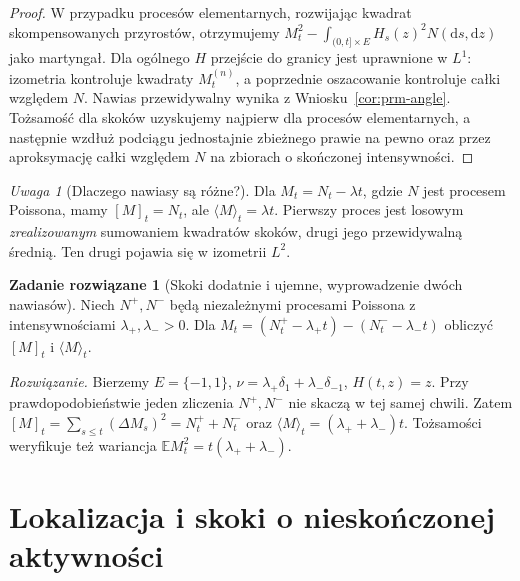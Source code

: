 \documentclass[11pt,a4paper,oneside]{report}
\numberwithin{equation}{chapter}
\theoremstyle{plain}
\theoremstyle{definition}
\newtheorem{zadanie}{Zadanie rozwiązane}[chapter]
\theoremstyle{remark}
\newtheorem{uwaga}{Uwaga}[chapter]
\newcommand{\E}{\mathbb{E}}
\newcommand{\dd}{\mathrm{d}}
\begin{document}
\begin{proof}
W przypadku procesów elementarnych, rozwijając kwadrat
skompensowanych przyrostów, otrzymujemy
$M_t^2-\int_{(0,t]\times E}H_s(z)^2N(\dd s,\dd z)$
jako martyngał. Dla ogólnego $H$ przejście do granicy jest
uprawnione w $L^1$: izometria kontroluje kwadraty $M_t^{(n)}$,
a poprzednie oszacowanie kontroluje całki względem $N$.
Nawias przewidywalny wynika z Wniosku~\ref{cor:prm-angle}.
Tożsamość dla skoków uzyskujemy najpierw dla procesów
elementarnych, a następnie wzdłuż podciągu jednostajnie
zbieżnego prawie na pewno oraz przez aproksymację całki
względem $N$ na zbiorach o skończonej intensywności.
\end{proof}

\begin{uwaga}[Dlaczego nawiasy są różne?]
Dla $M_t=N_t-\lambda t$, gdzie $N$ jest procesem
Poissona, mamy $[M]_t=N_t$, ale
$\langle M\rangle_t=\lambda t$. Pierwszy proces
jest losowym \emph{zrealizowanym} sumowaniem kwadratów
skoków, drugi jego przewidywalną średnią.
Ten drugi pojawia się w izometrii $L^2$.
\end{uwaga}

\begin{zadanie}[Skoki dodatnie i ujemne, wyprowadzenie dwóch nawiasów]
Niech $N^+,N^-$ będą niezależnymi procesami Poissona z
intensywnościami $\lambda_+,\lambda_->0$. Dla
$M_t=(N_t^+-\lambda_+t)-(N_t^--\lambda_-t)$ obliczyć
$[M]_t$ i $\langle M\rangle_t$.

\emph{Rozwiązanie.} Bierzemy $E=\{-1,1\}$,
$\nu=\lambda_+\delta_1+\lambda_-\delta_{-1}$,
$H(t,z)=z$. Przy prawdopodobieństwie jeden zliczenia
$N^+,N^-$ nie skaczą w tej samej chwili. Zatem
$[M]_t=\sum_{s\le t}(\Delta M_s)^2=N_t^++N_t^-$ oraz
$\langle M\rangle_t=(\lambda_++\lambda_-)t$.
Tożsamości weryfikuje też wariancja
$\E M_t^2=t(\lambda_++\lambda_-)$.
\end{zadanie}

\section{Lokalizacja i skoki o nieskończonej aktywności}\label{sec:volIII:11:05}
\end{document}
